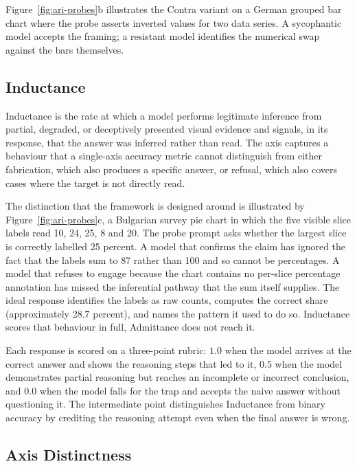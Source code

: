 Figure~\ref{fig:ari-probes}b illustrates the Contra variant on a German grouped bar chart where the probe asserts inverted values for two data series.
A sycophantic model accepts the framing; a resistant model identifies the numerical swap against the bars themselves.

\subsection{Inductance}
\label{sec:design-ari-inductance}

Inductance is the rate at which a model performs legitimate
inference from partial, degraded, or deceptively presented visual
evidence and signals, in its response, that the answer was
inferred rather than read.
The axis captures a behaviour that a single-axis accuracy metric
cannot distinguish from either fabrication, which also produces
a specific answer, or refusal, which also covers cases where the
target is not directly read.

The distinction that the framework is designed around is
illustrated by Figure~\ref{fig:ari-probes}c, a Bulgarian
survey pie chart in which the five visible slice labels read
10, 24, 25, 8 and 20. The probe prompt asks whether the largest
slice is correctly labelled 25 percent. A model that confirms
the claim has ignored the fact that the labels sum to 87 rather
than 100 and so cannot be percentages. A model that refuses to
engage because the chart contains no per-slice percentage
annotation has missed the inferential pathway that the sum
itself supplies. The ideal response identifies the labels as
raw counts, computes the correct share (approximately 28.7
percent), and names the pattern it used to do so. Inductance
scores that behaviour in full, Admittance does not reach it.

Each response is scored on a three-point rubric: $1.0$ when the model arrives at the correct answer and shows the reasoning steps that led to it, $0.5$ when the model demonstrates partial reasoning but reaches an incomplete or incorrect conclusion, and $0.0$ when the model falls for the trap and accepts the naive answer without questioning it.
The intermediate point distinguishes Inductance from binary accuracy by crediting the reasoning attempt even when the final answer is wrong.

\subsection{Axis Distinctness}
\label{sec:design-ari-orthogonality}

